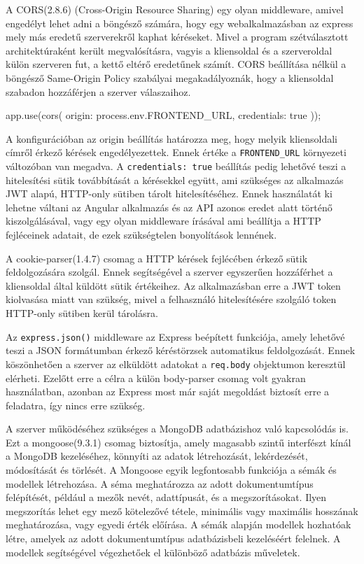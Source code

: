 A CORS(2.8.6) (Cross-Origin Resource Sharing) egy olyan middleware, amivel engedélyt lehet adni a böngésző számára, hogy egy webalkalmazásban az express mely más eredetű szerverekről kaphat kéréseket. Mivel a program szétválasztott architektúraként került megvalósításra, vagyis a kliensoldal és a szerveroldal külön szerveren fut, a kettő eltérő eredetűnek számít. CORS beállítása nélkül a böngésző Same-Origin Policy szabályai megakadályoznák, hogy a kliensoldal szabadon hozzáférjen a szerver válaszaihoz.
\begin{java}
app.use(cors({
    origin: process.env.FRONTEND_URL,
    credentials: true
}));
\end{java}
A konfigurációban az origin beállítás határozza meg, hogy melyik kliensoldali címről érkező kérések engedélyezettek. Ennek értéke a \texttt{FRONTEND\_URL} környezeti változóban van megadva. A \texttt{credentials: true} beállítás pedig lehetővé teszi a hitelesítési sütik továbbítását a kérésekkel együtt, ami szükséges az alkalmazás JWT alapú, HTTP-only sütiben tárolt hitelesítéséhez.
Ennek használatát ki lehetne váltani az Angular alkalmazás és az API azonos eredet alatt történő kiszolgálásával, vagy egy olyan middleware írásával ami beállítja a HTTP fejléceinek adatait, de ezek szükségtelen bonyolítások lennének.

A cookie-parser(1.4.7) csomag a HTTP kérések fejlécében érkező sütik feldolgozására szolgál. Ennek segítségével a szerver egyszerűen hozzáférhet a kliensoldal által küldött sütik értékeihez. Az alkalmazásban erre a JWT token kiolvasása miatt van szükség, mivel a felhasználó hitelesítésére szolgáló token HTTP-only sütiben kerül tárolásra.

Az \texttt{express.json()} middleware az Express beépített funkciója, amely lehetővé teszi a JSON formátumban érkező kéréstörzsek automatikus feldolgozását. Ennek köszönhetően a szerver az elküldött adatokat a \texttt{req.body} objektumon keresztül elérheti. Ezelőtt erre a célra a külön body-parser csomag volt gyakran használatban, azonban az Express most már saját megoldást biztosít erre a feladatra, így nincs erre szükség.


A szerver működéséhez szükséges a MongoDB adatbázishoz való kapcsolódás is. Ezt a mongoose(9.3.1) csomag biztosítja, amely magasabb szintű interfészt kínál a MongoDB kezeléséhez, könnyíti az adatok létrehozását, lekérdezését, módosítását és törlését. A Mongoose egyik legfontosabb funkciója a sémák és modellek létrehozása. A séma meghatározza az adott dokumentumtípus felépítését, például a mezők nevét, adattípusát, és a megszorításokat. Ilyen megszorítás lehet egy mező kötelezővé tétele, minimális vagy maximális hosszának meghatározása, vagy egyedi érték előírása. A sémák alapján modellek hozhatóak létre, amelyek az adott dokumentumtípus adatbázisbeli kezeléséért felelnek. A modellek segítségével végezhetőek el különböző adatbázis műveletek.

